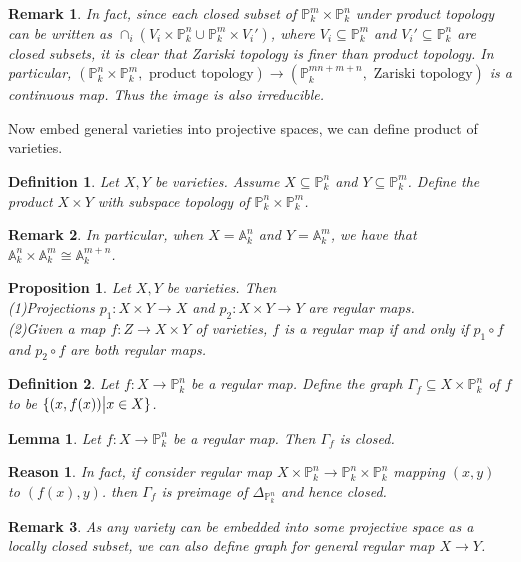 \documentclass{ctexart}
\newtheorem{definition}{Definition}[section]
\newtheorem{remark}{Remark}[section]
\newtheorem{proposition}{Proposition}[section]
\newtheorem{lemma}{Lemma}[section]
\newtheorem{reason}{Reason}[section]
\begin{document}
\begin{remark}
    In fact, since each closed subset of $\mathbb{P}_{k}^{m} \times \mathbb{P}_{k}^{n}$ under product topology can be written as $\cap_{i} (V_{i} \times \mathbb{P}_{k}^{n} \cup \mathbb{P}_{k}^{m} \times V_{i}')$,
    where $V_{i} \subseteq \mathbb{P}_{k}^{m}$ and $V_{i}' \subseteq \mathbb{P}_{k}^{n}$ are closed subsets, it is clear that Zariski topology is finer than product topology.
    In particular, $(\mathbb{P}_{k}^{n} \times \mathbb{P}_{k}^{m}, \text{ product topology}) \rightarrow (\mathbb{P}_{k}^{mn + m + n}, \text{ Zariski topology})$ is a continuous map.
    Thus the image is also irreducible.
\end{remark}
Now embed general varieties into projective spaces, we can define product of varieties.
\begin{definition}
    Let $X, Y$ be varieties.
    Assume $X \subseteq \mathbb{P}_{k}^{n}$ and $Y \subseteq \mathbb{P}_{k}^{m}$.
    Define the product $X \times Y$ with subspace topology of $\mathbb{P}_{k}^{n} \times \mathbb{P}_{k}^{m}$.
\end{definition}
\begin{remark}
    In particular, when $X = \mathbb{A}_{k}^{n}$ and $Y = \mathbb{A}_{k}^{m}$,
    we have that $\mathbb{A}_{k}^{n} \times \mathbb{A}_{k}^{m} \cong \mathbb{A}_{k}^{m + n}$.
\end{remark}
\begin{proposition}
    Let $X, Y$ be varieties.
    Then \\
    (1)Projections $p_{1}: X \times Y \rightarrow X$ and $p_{2}: X \times Y \rightarrow Y$ are regular maps. \\
    (2)Given a map $f: Z \rightarrow X \times Y$ of varieties, $f$ is a regular map if and only if $p_{1} \circ f$ and $p_{2} \circ f$ are both regular maps.
    \label{Proposition 3.2}
\end{proposition}
\begin{definition}
    Let $f: X \rightarrow \mathbb{P}_{k}^{n}$ be a regular map.
    Define the graph $\Gamma_{f} \subseteq X \times \mathbb{P}_{k}^{n}$ of $f$ to be $\{(x, f(x)) \big{|} x\in X\}$.
\end{definition}
\begin{lemma}
    Let $f: X \rightarrow \mathbb{P}_{k}^{n}$ be a regular map.
    Then $\Gamma_{f}$ is closed.
    \label{Lemma 3.1}
\end{lemma}
\begin{reason}
    In fact, if consider regular map $X \times \mathbb{P}_{k}^{n} \rightarrow \mathbb{P}_{k}^{n} \times \mathbb{P}_{k}^{n}$ mapping $(x, y)$ to $(f(x), y)$.
    then $\Gamma_{f}$ is preimage of $\Delta_{\mathbb{P}_{k}^{n}}$ and hence closed.
\end{reason}
\begin{remark}
    As any variety can be embedded into some projective space as a locally closed subset,
    we can also define graph for general regular map $X \rightarrow Y$.
\end{remark}
\end{document}
